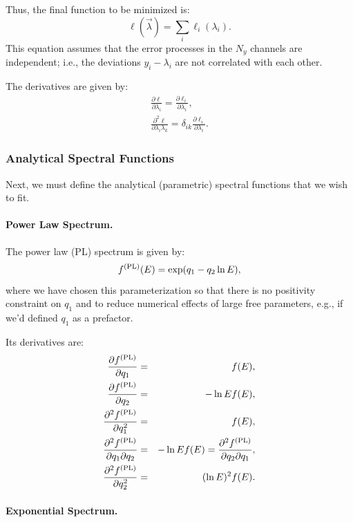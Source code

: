 \documentclass{article}    %
\newcommand{\subsubsubsection}[1]{\paragraph{#1.}}
\begin{document}
Thus, the final function to be minimized is:
\begin{equation}
\ell(\vec{\lambda}) = \sum_i \ell_i(\lambda_i).
\end{equation}
This equation assumes that the error processes in the $N_y$ channels
are independent; i.e., the deviations $y_i-\lambda_i$ are not
correlated with each other.

The derivatives are given by:
\begin{eqnarray}
\frac{\partial \ell}{\partial \lambda_i} = \frac{\partial \ell_i}{\partial \lambda_i}, \\
\frac{\partial^2 \ell}{\partial \lambda_i \lambda_k} = \delta_{ik}\frac{\partial \ell_i}{\partial \lambda_i}.
\end{eqnarray}

\subsubsection{Analytical Spectral Functions}
\label{secAnalyticalSpectra}

Next, we must define the analytical (parametric) spectral functions
that we wish to fit.

\subsubsubsection{Power Law Spectrum}

The power law (PL) spectrum is given by:
\begin{equation}
f^{\rm (PL)}(E) = \exp(q_1 - q_2\ln E),
\end{equation}
where we have chosen this parameterization so that there is no
positivity constraint on $q_1$ and to reduce numerical effects of
large free parameters, e.g., if we'd defined $q_1$ as a prefactor.

Its derivatives are:
\begin{eqnarray}
\frac{\partial f^{\rm (PL)}}{\partial q_1} &=& f(E), \\
\frac{\partial f^{\rm (PL)}}{\partial q_2} &=& -\ln Ef(E), \\
\frac{\partial^2 f^{\rm (PL)}}{\partial q_1^2} &=& f(E), \\
\frac{\partial^2 f^{\rm (PL)}}{\partial q_1\partial q_2} &=& -\ln Ef(E) 
= \frac{\partial^2 f^{\rm (PL)}}{\partial q_2\partial q_1}, \\
\frac{\partial^2 f^{\rm (PL)}}{\partial q_2^2} &=& (\ln E)^2 f(E).
\end{eqnarray}

\subsubsubsection{Exponential Spectrum}
\end{document}
